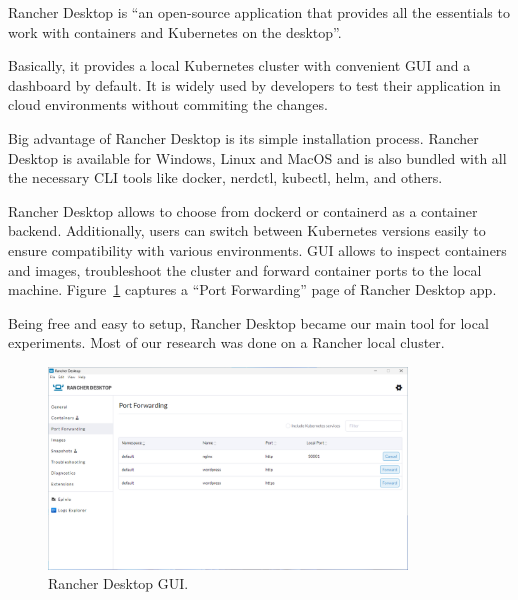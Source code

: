 Rancher Desktop is ``an open-source application that provides all the essentials to work with containers and Kubernetes on the desktop''. \cite{rancher-desktop}

Basically, it provides a local Kubernetes cluster with convenient GUI and a dashboard by default. It is widely used by developers to test their application in cloud environments without commiting the changes. 

Big advantage of Rancher Desktop is its simple installation process. Rancher Desktop is available for Windows, Linux and MacOS and is also bundled with all the necessary CLI tools like docker, nerdctl, kubectl, helm, and others.

Rancher Desktop allows to choose from dockerd or containerd as a container backend. Additionally, users can switch between Kubernetes versions easily to ensure compatibility with various environments. GUI allows to inspect containers and images, troubleshoot the cluster and forward container ports to the local machine. Figure~\ref{img:rancher-desktop} captures a ``Port Forwarding'' page of Rancher Desktop app.

Being free and easy to setup, Rancher Desktop became our main tool for local experiments. Most of our research was done on a Rancher local cluster. 

\begin{figure}[!hbt]
	\begin{center}
		\includegraphics[width=0.85\textwidth]{images/rancher-desktop.png}
        \caption{Rancher Desktop GUI.}
		\label{img:rancher-desktop}
	\end{center}
\end{figure}
